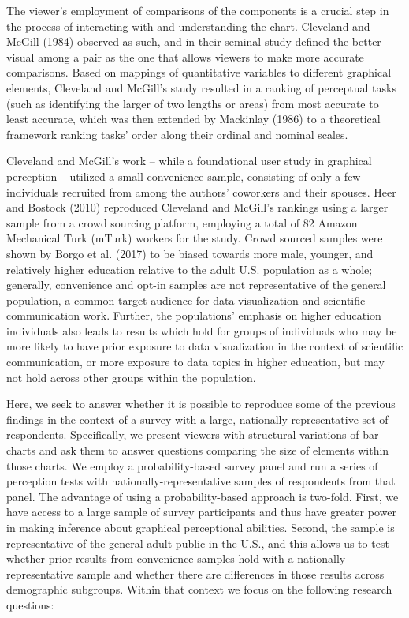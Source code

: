 \documentclass[
]{jds}
\begin{document}
The viewer's employment of comparisons of the components is a crucial
step in the process of interacting with and understanding the chart.
Cleveland and McGill (1984) observed as such, and in their seminal study
defined the better visual among a pair as the one that allows viewers to
make more accurate comparisons. Based on mappings of quantitative
variables to different graphical elements, Cleveland and McGill's study
resulted in a ranking of perceptual tasks (such as identifying the
larger of two lengths or areas) from most accurate to least accurate,
which was then extended by Mackinlay (1986) to a theoretical framework
ranking tasks' order along their ordinal and nominal scales.

Cleveland and McGill's work -- while a foundational user study in
graphical perception -- utilized a small convenience sample, consisting
of only a few individuals recruited from among the authors' coworkers
and their spouses. Heer and Bostock (2010) reproduced Cleveland and
McGill's rankings using a larger sample from a crowd sourcing platform,
employing a total of 82 Amazon Mechanical Turk (mTurk) workers for the
study. Crowd sourced samples were shown by Borgo et al. (2017) to be
biased towards more male, younger, and relatively higher education
relative to the adult U.S. population as a whole; generally, convenience
and opt-in samples are not representative of the general population, a
common target audience for data visualization and scientific
communication work. Further, the populations' emphasis on higher
education individuals also leads to results which hold for groups of
individuals who may be more likely to have prior exposure to data
visualization in the context of scientific communication, or more
exposure to data topics in higher education, but may not hold across
other groups within the population.

Here, we seek to answer whether it is possible to reproduce some of the
previous findings in the context of a survey with a large,
nationally-representative set of respondents. Specifically, we present
viewers with structural variations of bar charts and ask them to answer
questions comparing the size of elements within those charts. We employ
a probability-based survey panel and run a series of perception tests
with nationally-representative samples of respondents from that panel.
The advantage of using a probability-based approach is two-fold. First,
we have access to a large sample of survey participants and thus have
greater power in making inference about graphical perceptional
abilities. Second, the sample is representative of the general adult
public in the U.S., and this allows us to test whether prior results
from convenience samples hold with a nationally representative sample
and whether there are differences in those results across demographic
subgroups. Within that context we focus on the following research
questions:
\end{document}
